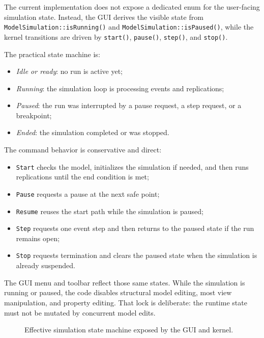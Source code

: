 The current implementation does not expose a dedicated enum for the user-facing
simulation state. Instead, the GUI derives the visible state from
\texttt{ModelSimulation::isRunning()} and \texttt{ModelSimulation::isPaused()},
while the kernel transitions are driven by \texttt{start()},
\texttt{pause()}, \texttt{step()}, and \texttt{stop()}.

The practical state machine is:
\begin{itemize}
\item \textit{Idle or ready}: no run is active yet;
\item \textit{Running}: the simulation loop is processing events and
replications;
\item \textit{Paused}: the run was interrupted by a pause request, a step
request, or a breakpoint;
\item \textit{Ended}: the simulation completed or was stopped.
\end{itemize}

The command behavior is conservative and direct:
\begin{itemize}
\item \texttt{Start} checks the model, initializes the simulation if needed,
and then runs replications until the end condition is met;
\item \texttt{Pause} requests a pause at the next safe point;
\item \texttt{Resume} reuses the start path while the simulation is paused;
\item \texttt{Step} requests one event step and then returns to the paused
state if the run remains open;
\item \texttt{Stop} requests termination and clears the paused state when the
simulation is already suspended.
\end{itemize}

The GUI menu and toolbar reflect those same states. While the simulation is
running or paused, the code disables structural model editing, most view
manipulation, and property editing. That lock is deliberate: the runtime state
must not be mutated by concurrent model edits.

\begin{figure}[htbp]
\centering
\caption{Effective simulation state machine exposed by the GUI and kernel.}
\label{fig:running-simulations-state-machine}
\end{figure}

